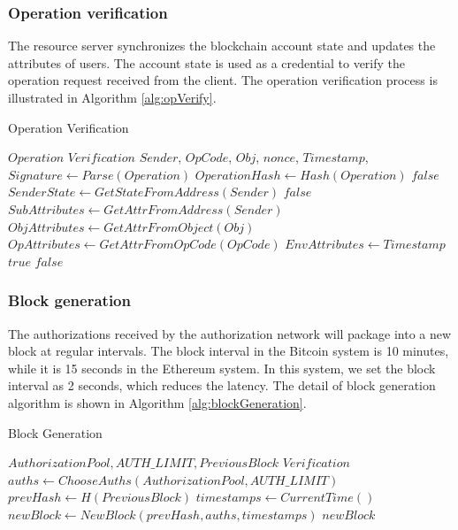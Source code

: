 \subsubsection{Operation verification}

The resource server synchronizes the blockchain account state and updates the attributes of users. The account state is used as a credential to verify the operation request received from the client. The operation verification process is illustrated in Algorithm \ref{alg:opVerify}.

 \begin{algorithm}
 \caption{Operation Verification}
   \begin{algorithmic}[H]\label{alg:opVerify}
   \renewcommand{\algorithmicrequire}{\textbf{Input:}}
   \renewcommand{\algorithmicensure}{\textbf{Output:}}
   \REQUIRE $Operation$
   \ENSURE  $Verification$
    \STATE $Sender$, $OpCode$, $Obj$, $nonce$, $Timestamp$, $Signature \gets Parse(Operation)$
    \STATE $OperationHash \gets Hash(Operation)$
      \RETURN $false$
    \ENDIF
    \STATE $SenderState \gets GetStateFromAddress(Sender)$
      \RETURN $false$
    \ENDIF
    \STATE$SubAttributes \gets GetAttrFromAddress(Sender)$
    \STATE$ObjAttributes \gets GetAttrFromObject(Obj)$
    \STATE$OpAttributes \gets GetAttrFromOpCode(OpCode)$
    \STATE$EnvAttributes \gets Timestamp$
        \RETURN $true$
      \ENDIF
    \ENDFOR
   \RETURN $false$
   \end{algorithmic}
 \end{algorithm}

\subsubsection{Block generation}

The authorizations received by the authorization network will package into a new block at regular intervals. The block interval in the Bitcoin system is 10 minutes, while it is 15 seconds in the Ethereum system. In this system, we set the block interval as 2 seconds, which reduces the latency. The detail of block generation algorithm is shown in Algorithm \ref{alg:blockGeneration}.

 \begin{algorithm}
 \caption{Block Generation}\label{alg:blockGeneration}
   \begin{algorithmic}[!htbp]
   \renewcommand{\algorithmicrequire}{\textbf{Input:}}
   \renewcommand{\algorithmicensure}{\textbf{Output:}}
   \REQUIRE $AuthorizationPool, AUTH\_LIMIT, PreviousBlock$
   \ENSURE  $Verification$
    \STATE $auths \gets ChooseAuths(AuthorizationPool, AUTH\_LIMIT)$
    \STATE $prevHash \gets H(PreviousBlock)$
    \STATE $timestamps \gets CurrentTime()$
    \STATE $newBlock \gets NewBlock(prevHash, auths, timestamps)$
   \RETURN $newBlock$
   \end{algorithmic}
 \end{algorithm}

